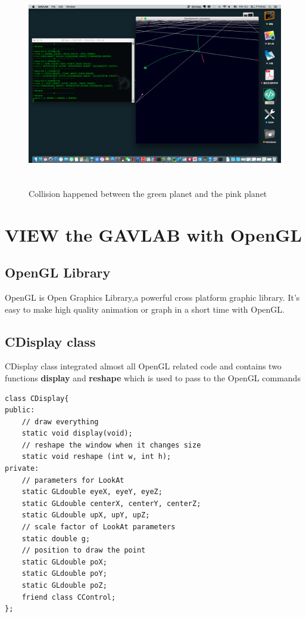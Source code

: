 \documentclass[12pt]{article}
\begin{document}
\begin{figure}[H]
\centering
\includegraphics[width=14.4cm,height=9cm]{collision.png}
\caption{Collision happened between the green planet and the pink planet}
\end{figure}

\clearpage

\section{VIEW the GAVLAB with OpenGL}
\subsection{OpenGL Library}
OpenGL is Open Graphics Library,a powerful cross platform graphic library.
It's easy to make high quality animation or graph in a short time with OpenGL.
\subsection{CDisplay class}
CDisplay class integrated almost all OpenGL related code and contains two functions \textbf{display} and \textbf{reshape}
which is used to pass to the OpenGL commands 
\begin{lstlisting}[caption=CDisplay]
class CDisplay{
public:
    // draw everything
    static void display(void);
    // reshape the window when it changes size
    static void reshape (int w, int h);
private:
    // parameters for LookAt
    static GLdouble eyeX, eyeY, eyeZ;
    static GLdouble centerX, centerY, centerZ;
    static GLdouble upX, upY, upZ;
    // scale factor of LookAt parameters
    static double g;
    // position to draw the point
    static GLdouble poX;
    static GLdouble poY;
    static GLdouble poZ;
    friend class CControl;
};
\end{lstlisting}
\end{document}
